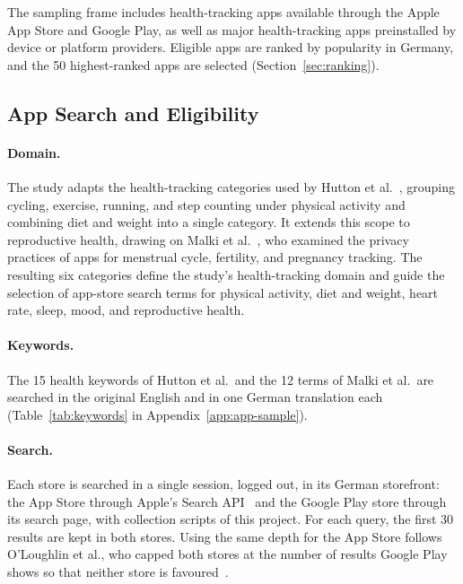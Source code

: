 The sampling frame includes health-tracking apps available through the Apple App Store and
Google Play, as well as major health-tracking apps preinstalled by device or platform providers.
Eligible apps are ranked by popularity in Germany, and the 50 highest-ranked apps are selected
(Section~\ref{sec:ranking}).

\subsection{App Search and Eligibility}
\label{sec:app-search}
\paragraph{Domain.} The study adapts the health-tracking categories used by Hutton et
al.~\parencite{hutton2018assessing}, grouping cycling, exercise, running, and step counting
under physical activity and combining diet and weight into a single category. It extends this
scope to reproductive health, drawing on Malki et al.~\parencite{malki2024exploring}, who
examined the privacy practices of apps for menstrual cycle, fertility, and pregnancy tracking.
The resulting six categories define the study's health-tracking domain and guide the selection
of app-store search terms for physical activity, diet and weight, heart rate, sleep, mood, and
reproductive health.

\paragraph{Keywords.} The 15 health keywords of Hutton et al.\ and the 12
terms of Malki et al.\ are searched in the original English and in one German
translation each (Table~\ref{tab:keywords} in Appendix~\ref{app:app-sample}).

\paragraph{Search.} Each store is searched in a single session, logged out, in
its German storefront: the App Store through Apple's Search
API~\parencite{apple2022itunessearch} and the Google Play store through its
search page, with collection scripts of this project. For each query,
the first 30 results are kept in both stores. Using the same depth for the App Store follows
O'Loughlin et al., who capped both stores at the number of results Google Play
shows so that neither store is favoured~\parencite{oloughlin2019reviewing}.

